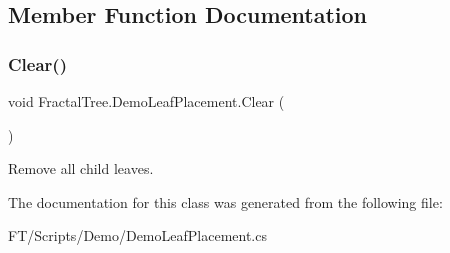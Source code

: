 \subsection{Member Function Documentation}
\mbox{\label{class_fractal_tree_1_1_demo_leaf_placement_a745d74525906a3177b7ac67ac94280cf}} 
\subsubsection{\texorpdfstring{Clear()}{Clear()}}
{\footnotesize\ttfamily void Fractal\+Tree.\+Demo\+Leaf\+Placement.\+Clear (\begin{DoxyParamCaption}{ }\end{DoxyParamCaption})}



Remove all child leaves. 



The documentation for this class was generated from the following file\+:\begin{DoxyCompactItemize}
\item 
F\+T/\+Scripts/\+Demo/Demo\+Leaf\+Placement.\+cs\end{DoxyCompactItemize}
